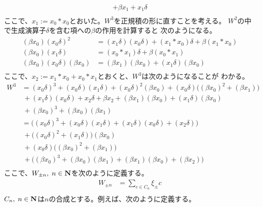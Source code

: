 {\begin{equation*}
\begin{split}
			+ \beta x_1 + x_1 \delta \\
	\end{split}\end{equation*}
	ここで、$x_1:=x_0*x_0$とおいた。$W^3$を正規積の形に直すことを考える。
	$W^2$の中で生成演算子$\delta$を含む項への$\beta$の作用を計算すると
	次のようになる。
	\begin{equation*}\begin{split}
		(\beta x_0)(x_0 \delta)^2 
		&= (x_1 \delta)(x_0\delta) + (x_1*x_0)\delta + \beta(x_1*x_0)  \\
		(\beta x_0)(x_1\delta) &= (x_0*x_1)\delta + \beta(x_0*x_1) \\
		(\beta x_0)(x_0\delta)(\beta x_0) 
		&= (\beta x_1)(\beta x_0) + (x_1 \delta)(\beta x_0) \\
	\end{split}\end{equation*}
	ここで、$x_2:=x_1*x_0+x_0*x_1$とおくと、$W^3$は次のようになることが
	わかる。
	\begin{equation*}\begin{split}
		W^3 &= (x_0\delta)^3 + (x_0\delta)(x_1 \delta)
			+ (x_0\delta)^2(\beta x_0)
			+ (x_0\delta)\biggl((\beta x_0)^2 + (\beta x_1)\biggr) \\
		&\, + (x_1 \delta)(x_0\delta) + x_2 \delta + \beta x_2
			+ (\beta x_1)(\beta x_0) + (x_1 \delta)(\beta x_0) \\
		&\, + (\beta x_0)^3 + (\beta x_0)(\beta x_1) \\
		&= \biggl((x_0\delta)^3 + (x_0\delta)(x_1 \delta) 
			+ (x_1 \delta)(x_0\delta) + (x_2\delta)\biggr) \\
		&\, + \biggl((x_0\delta)^2 + (x_1\delta)\biggr)(\beta x_0) \\
		&\, + (x_0\delta)\biggl((\beta x_0)^2 + (\beta x_1)\biggr) \\
		&\, + \biggl((\beta x_0)^3 + (\beta x_0)(\beta x_1) 
			+ (\beta x_1)(\beta x_0) + (\beta x_2)\biggr) \\
	\end{split}\end{equation*}
	ここで、$W_{\pm n},\;n\in\mathbf{N}$を次のように定義する。
	\begin{equation*}\begin{split}
		W_{\pm n} &= \sum_{c\in C_n} \xi_\pm c \\
	\end{split}\end{equation*}
	$C_n,\;n\in\mathbf{N}$は$n$の合成とする。例えば、次のように定義する。
	\begin{equation*}\begin{split}

\end{split}
\end{equation*}}
